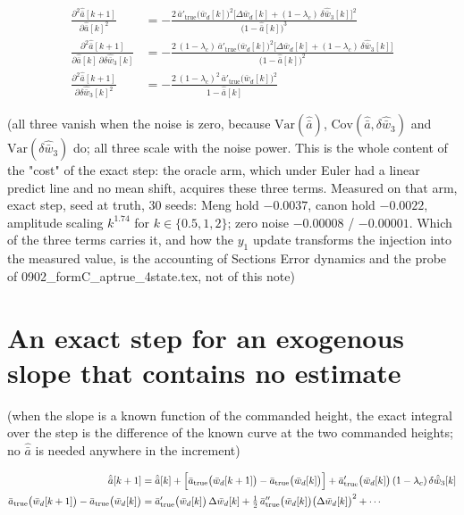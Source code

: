 \documentclass[11pt,a4paper,fontset=none]{ctexart}
\newcommand{\ba}{\bar{a}}
\newcommand{\bw}{\bar{w}}
\begin{document}
\begin{align*}
\frac{\partial^{2}\hat{\ba}[k+1]}{\partial\hat{\ba}[k]^{2}}
  &= -\frac{2\,\ba'_{\mathrm{true}}\bigl(\bw_d[k]\bigr)^{2}
        \bigl[\Delta\bw_d[k] + (1-\lambda_c)\,\delta\hat{\bw}_3[k]\bigr]^{2}}
       {\bigl(1-\hat{\ba}[k]\bigr)^{3}} \\
\frac{\partial^{2}\hat{\ba}[k+1]}{\partial\hat{\ba}[k]\,\partial\delta\hat{\bw}_3[k]}
  &= -\frac{2\,(1-\lambda_c)\,\ba'_{\mathrm{true}}\bigl(\bw_d[k]\bigr)^{2}
        \bigl[\Delta\bw_d[k] + (1-\lambda_c)\,\delta\hat{\bw}_3[k]\bigr]}
       {\bigl(1-\hat{\ba}[k]\bigr)^{2}} \\
\frac{\partial^{2}\hat{\ba}[k+1]}{\partial\delta\hat{\bw}_3[k]^{2}}
  &= -\frac{2\,(1-\lambda_c)^{2}\,\ba'_{\mathrm{true}}\bigl(\bw_d[k]\bigr)^{2}}
       {1-\hat{\ba}[k]}
\end{align*}

(all three vanish when the noise is zero, because
$\mathrm{Var}(\hat{\ba})$, $\mathrm{Cov}(\hat{\ba},\delta\hat{\bw}_3)$ and
$\mathrm{Var}(\delta\hat{\bw}_3)$ do; all three scale with the noise power.
This is the whole content of the "cost" of the exact step: the oracle arm,
which under Euler had a linear predict line and no mean shift, acquires these
three terms. Measured on that arm, exact step, seed at truth, 30 seeds:
Meng hold $-0.0037$, canon hold $-0.0022$, amplitude scaling $k^{1.74}$
for $k \in \{0.5, 1, 2\}$; zero noise $-0.00008$ / $-0.00001$.
Which of the three terms carries it, and how the $y_1$ update transforms the
injection into the measured value, is the accounting of Sections
Error dynamics and the probe of 0902\_formC\_aptrue\_4state.tex, not of this note)

\section{An exact step for an exogenous slope that contains no estimate}

(when the slope is a known function of the commanded height, the exact
integral over the step is the difference of the known curve at the two
commanded heights; no $\hat{\ba}$ is needed anywhere in the increment)

\begin{align*}
\hat{\ba}[k+1] &= \hat{\ba}[k]
  + \Bigl[\ba_{\mathrm{true}}\bigl(\bw_d[k+1]\bigr) - \ba_{\mathrm{true}}\bigl(\bw_d[k]\bigr)\Bigr]
  + \ba'_{\mathrm{true}}\bigl(\bw_d[k]\bigr)\,(1-\lambda_c)\,\delta\hat{\bw}_3[k] \\
\ba_{\mathrm{true}}\bigl(\bw_d[k+1]\bigr) - \ba_{\mathrm{true}}\bigl(\bw_d[k]\bigr)
  &= \ba'_{\mathrm{true}}\bigl(\bw_d[k]\bigr)\,\Delta\bw_d[k]
   + \tfrac{1}{2}\,\ba''_{\mathrm{true}}\bigl(\bw_d[k]\bigr)\bigl(\Delta\bw_d[k]\bigr)^{2}
   + \cdots
\end{align*}
\end{document}
